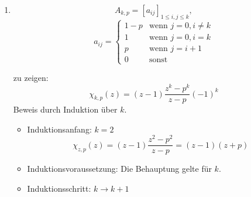 \begin{enumerate}
\item
  \[ A_{k,p} = \left[a_{ij}\right]_{1\leq i,j\leq k}, \]
  \[ a_{ij} = \begin{cases} 1-p &\text{wenn~} j = 0, i \not= k \\
                              1 &\text{wenn~} j = 0, i = k \\
                              p &\text{wenn~} j = i + 1 \\
                              0 &\text{sonst} \end{cases} \]

  zu zeigen: \[ \chi_{k,p}(z) = (z - 1) \frac{z^{k}-p^{k}}{z-p}(-1)^{k} \]
  Beweis durch Induktion über $k$.
  \begin{itemize}
    \item Induktionsanfang: $k = 2$
      \[ \chi_{z,p}(z) = (z - 1) \frac{z^{2}-p^{2}}{z-p} = (z-1)(z+p) \]
    \item Induktionsvoraussetzung: Die Behauptung gelte für $k$.
    \item Induktionsschritt: $k \rightarrow k + 1$
    

\end{itemize}
\end{enumerate}
